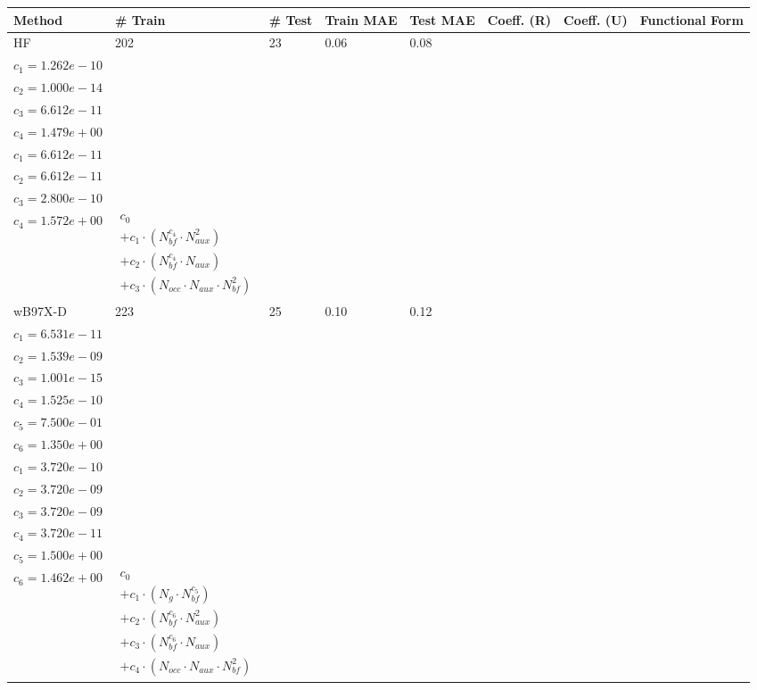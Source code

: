 \small
\setlength{\tabcolsep}{2pt}
\begin{longtable}{|p{1.7cm}|p{1.2cm}|p{1.1cm}|p{1.4cm}|p{1.3cm}|p{3.0cm}|p{3.0cm}|p{4.8cm}|}
\hline
\textbf{Method} & \textbf{\# Train} & \textbf{\# Test} & \textbf{Train MAE} & \textbf{Test MAE} & \textbf{Coeff. (R)} & \textbf{Coeff. (U)} & \textbf{Functional Form} \\ 
\hline
\endhead
HF & 202 & 23 & 0.06 & 0.08 & \begin{tabular}{l}\(c_{0}=3.037e+00\) \\ \(c_{1}=1.262e-10\) \\ \(c_{2}=1.000e-14\) \\ \(c_{3}=6.612e-11\) \\ \(c_{4}=1.479e+00\)\end{tabular} & \begin{tabular}{l}\(c_{0}=1.000e+00\) \\ \(c_{1}=6.612e-11\) \\ \(c_{2}=6.612e-11\) \\ \(c_{3}=2.800e-10\) \\ \(c_{4}=1.572e+00\)\end{tabular} & $\begin{array}{l}c_{0} \\ + c_{1}  \cdot  (N_{bf} ^{c_{4}}  \cdot  N_{aux} ^{2}) \\ + c_{2}  \cdot  (N_{bf} ^{c_{4}}  \cdot  N_{aux}) \\ + c_{3}  \cdot  (N_{occ}  \cdot  N_{aux}  \cdot  N_{bf} ^{2})\end{array}$ \\ 
\hline
wB97X-D & 223 & 25 & 0.10 & 0.12 & \begin{tabular}{l}\(c_{0}=1.176e+01\) \\ \(c_{1}=6.531e-11\) \\ \(c_{2}=1.539e-09\) \\ \(c_{3}=1.001e-15\) \\ \(c_{4}=1.525e-10\) \\ \(c_{5}=7.500e-01\) \\ \(c_{6}=1.350e+00\)\end{tabular} & \begin{tabular}{l}\(c_{0}=1.828e-04\) \\ \(c_{1}=3.720e-10\) \\ \(c_{2}=3.720e-09\) \\ \(c_{3}=3.720e-09\) \\ \(c_{4}=3.720e-11\) \\ \(c_{5}=1.500e+00\) \\ \(c_{6}=1.462e+00\)\end{tabular} & $\begin{array}{l}c_{0} \\ + c_{1}  \cdot  (N_{g}  \cdot  N_{bf} ^{c_{5}}) \\ + c_{2}  \cdot  (N_{bf} ^{c_{6}}  \cdot  N_{aux}^{2}) \\ + c_{3}  \cdot  (N_{bf} ^{c_{6}}  \cdot  N_{aux}) \\ + c_{4}  \cdot  (N_{occ}  \cdot  N_{aux}  \cdot  N_{bf} ^{2})\end{array}$ \\ 

\end{longtable}
